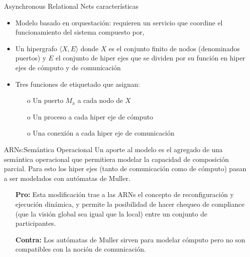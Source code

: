 \documentclass[10pt,xcolor={table,dvipsnames},t]{beamer}
\begin{document}
\begin{frame}{Asynchronous Relational Nets características}

\begin{itemize}
    \item Modelo basado en orquestación: requieren un servicio que coordine el funcionamiento del sistema compuesto por,

    \item Un hipergrafo $\langle X,E \rangle$ donde $X$ es el conjunto finito de nodos (denominados puertos) y $E$ el conjunto de hiper ejes que se dividen por su función en hiper ejes de cómputo y de comunicación
    
    \item Tres funciones de etiquetado que asignan:
        \begin{itemize}
            \item[o] Un puerto $M_x$ a cada nodo de $X$
            \item[o] Un proceso a cada hiper eje de cómputo 
            \item[o] Una conexión a cada hiper eje de comunicación
        \end{itemize}
\end{itemize}

\end{frame}

\begin{frame}{ARNs:Semántica Operacional}
    Un aporte al modelo es el agregado de una semántica operacional que permitiera modelar la capacidad de composición parcial. Para esto los hiper ejes (tanto de comunicación como de cómputo) pasan a ser modelados con autómatas de Muller.
    \begin{itemize}
        \item[\textbf{Pro:}] Esta modificación trae a las ARNs el concepto de reconfiguración y ejecución dinámica, y permite la posibilidad de hacer chequeo de compliance (que la visión global sea igual que la local) entre un conjunto de participantes.
        
        \item[\textbf{Contra:}]Los autómatas de Muller sirven para modelar cómputo pero no son compatibles con la noción de comunicación.
    \end{itemize}
\end{frame}
\end{document}
